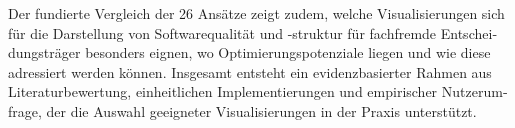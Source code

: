 \begin{otherlanguage}{ngerman}
Der fundierte Vergleich der 26 Ansätze zeigt zudem, welche Visualisierungen sich für die Darstellung von Softwarequalität und -struktur für fachfremde Entscheidungsträger besonders eignen, wo Optimierungspotenziale liegen und wie diese adressiert werden können. Insgesamt entsteht ein evidenzbasierter Rahmen aus Literaturbewertung, einheitlichen Implementierungen und empirischer Nutzerumfrage, der die Auswahl geeigneter Visualisierungen in der Praxis unterstützt.

\end{otherlanguage}